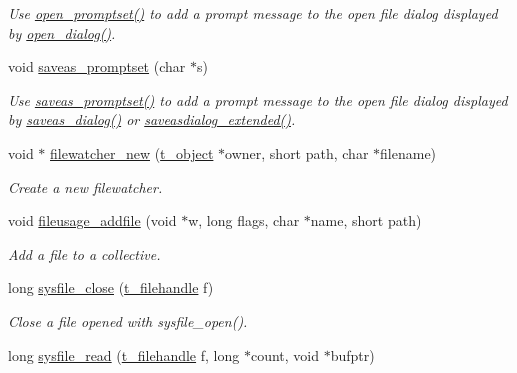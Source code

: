 \begin{DoxyCompactItemize}
\begin{DoxyCompactList}\small\item\em Use \hyperlink{group__files_gaff6d7264cad52c579b9373870bed50db}{open\_\-promptset()} to add a prompt message to the open file dialog displayed by \hyperlink{group__files_ga0d8fd0b13e2e623298a45e846af3fe1a}{open\_\-dialog()}. \item\end{DoxyCompactList}\item 
void \hyperlink{group__files_ga16a1f7bdea74c0e0009210a8430d0654}{saveas\_\-promptset} (char $\ast$s)
\begin{DoxyCompactList}\small\item\em Use \hyperlink{group__files_ga16a1f7bdea74c0e0009210a8430d0654}{saveas\_\-promptset()} to add a prompt message to the open file dialog displayed by \hyperlink{group__files_gaf526009ce84aed6f6213c4a99f6bd72d}{saveas\_\-dialog()} or \hyperlink{group__files_gad43815aaa436e518a5cc68d2a340e4de}{saveasdialog\_\-extended()}. \item\end{DoxyCompactList}\item 
void $\ast$ \hyperlink{group__files_gab81ffeda175d0b35f112d8f21ba6e819}{filewatcher\_\-new} (\hyperlink{structt__object}{t\_\-object} $\ast$owner, short path, char $\ast$filename)
\begin{DoxyCompactList}\small\item\em Create a new filewatcher. \item\end{DoxyCompactList}\item 
void \hyperlink{group__files_ga30ae954756330e63f7b70fd5d312a90b}{fileusage\_\-addfile} (void $\ast$w, long flags, char $\ast$name, short path)
\begin{DoxyCompactList}\small\item\em Add a file to a collective. \item\end{DoxyCompactList}\item 
long \hyperlink{group__files_gad17b977bcb191648c2856d589c45f0d4}{sysfile\_\-close} (\hyperlink{group__files_gafcb776aa74d514754e83b30995b5a5d1}{t\_\-filehandle} f)
\begin{DoxyCompactList}\small\item\em Close a file opened with sysfile\_\-open(). \item\end{DoxyCompactList}\item 
long \hyperlink{group__files_gae1ca61adcbe2234246d15bc7d22c4794}{sysfile\_\-read} (\hyperlink{group__files_gafcb776aa74d514754e83b30995b5a5d1}{t\_\-filehandle} f, long $\ast$count, void $\ast$bufptr)

\end{DoxyCompactItemize}
